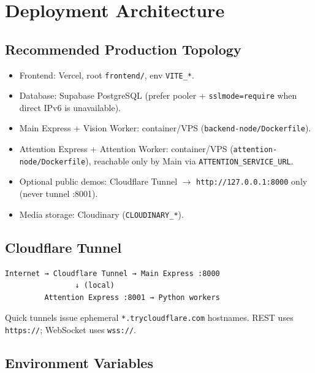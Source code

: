 \documentclass[11pt,a4paper]{report}
\begin{document}
\chapter{Deployment Architecture}

\section{Recommended Production Topology}
\begin{itemize}
  \item Frontend: Vercel, root \texttt{frontend/}, env \texttt{VITE\_*}.
  \item Database: Supabase PostgreSQL (prefer pooler + \texttt{sslmode=require} when direct IPv6 is unavailable).
  \item Main Express + Vision Worker: container/VPS (\texttt{backend-node/Dockerfile}).
  \item Attention Express + Attention Worker: container/VPS (\texttt{attention-node/Dockerfile}), reachable only by Main via \texttt{ATTENTION\_SERVICE\_URL}.
  \item Optional public demos: Cloudflare Tunnel $\rightarrow$ \texttt{http://127.0.0.1:8000} only (never tunnel :8001).
  \item Media storage: Cloudinary (\texttt{CLOUDINARY\_*}).
\end{itemize}

\section{Cloudflare Tunnel}
\begin{verbatim}
Internet → Cloudflare Tunnel → Main Express :8000
                ↓ (local)
         Attention Express :8001 → Python workers
\end{verbatim}
Quick tunnels issue ephemeral \texttt{*.trycloudflare.com} hostnames. REST uses \texttt{https://}; WebSocket uses \texttt{wss://}.

\section{Environment Variables}
\end{document}
